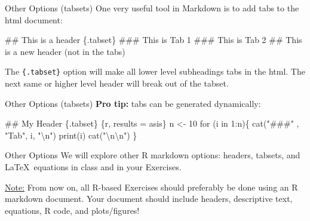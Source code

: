 \documentclass[
  ignorenonframetext,
  aspectratio=169]{beamer}
\newenvironment{Shaded}{\begin{snugshade}}{\end{snugshade}}
\newcommand{\NormalTok}[1]{#1}
\begin{document}
\begin{frame}[fragile]{Other Options (tabsets)}
\label{other-options-tabsets}
One very useful tool in Markdown is to add tabs to the html document:

\begin{Shaded}
\begin{Highlighting}[]
\NormalTok{\#\# This is a header \{.tabset\}}
\NormalTok{\#\#\# This is Tab 1}
\NormalTok{\#\#\# This is Tab 2}
\NormalTok{\#\# This is a new header (not in the tabs)}
\end{Highlighting}
\end{Shaded}

The \texttt{\{.tabset\}} option will make all lower level subheadings
tabs in the html. The next same or higher level header will break out of
the tabset.
\end{frame}

\begin{frame}[fragile]{Other Options (tabsets)}
\label{other-options-tabsets-1}
\textbf{Pro tip:} tabs can be generated dynamically:

\begin{Shaded}
\begin{Highlighting}[]
\NormalTok{\#\# My Header \{.tabset\}}
\NormalTok{\textasciigrave{}\textasciigrave{}\textasciigrave{}\{r, results = \textquotesingle{}asis\textquotesingle{}\}}
\NormalTok{n \textless{}{-} 10}
\NormalTok{for (i in 1:n)\{}
\NormalTok{  cat("\#\#\#" , "Tab", i, "\textbackslash{}n")}
\NormalTok{    print(i)}
\NormalTok{  cat("\textbackslash{}n\textbackslash{}n")}
\NormalTok{\}}
\NormalTok{\textasciigrave{}\textasciigrave{}\textasciigrave{}}
\end{Highlighting}
\end{Shaded}
\end{frame}

\begin{frame}{Other Options}
\label{other-options}
We will explore other R markdown options: headers, tabsets, and
\LaTeX~equations in class and in your Exercises.

\underline{Note:} From now on, all R-based Exercises should preferably
be done using an R markdown document. Your document should include
headers, descriptive text, equations, R code, and plots/figures!
\end{frame}
\end{document}
